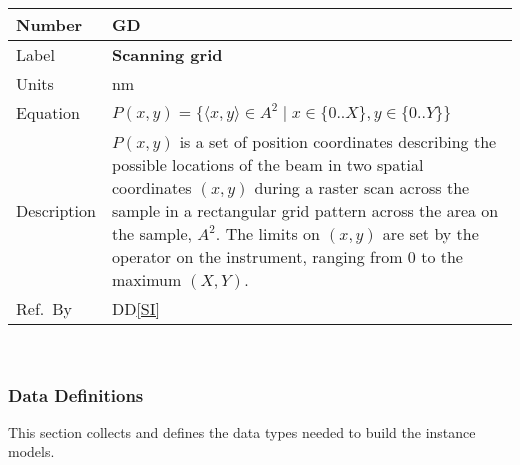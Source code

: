 \documentclass[12pt]{article}
\newcommand{\colAwidth}{0.13\textwidth}
\newcommand{\colBwidth}{0.82\textwidth}
\newcounter{defnum} %
\newcommand{\ddref}[1]{DD\ref{#1}}
\begin{document}
\noindent
\begin{minipage}{\textwidth}
	\renewcommand*{\arraystretch}{1.5}
	\begin{tabular}{| p{\colAwidth} | p{\colBwidth}|}
		\hline
		\rowcolor[gray]{0.9}
		Number& GD{defnum}\thedefnum \label{grid}\\
		\hline
		Label & \textbf{Scanning grid}  \\
		\hline
		Units& \si{\nano\metre}\\
		\hline
		Equation& $P(x,y) = \{\langle x, y \rangle \in A^2 \mid x \in \{0..X\}, y \in \{0..Y\} \}$\\
		\hline
		Description & $P(x,y)$ is a set of position coordinates describing the possible locations of the beam in two spatial coordinates $(x, y)$ during a raster scan across the sample in a rectangular grid pattern across the area on the sample, $A^2$. The limits on $(x,y)$ are set by the operator on the instrument, ranging from 0 to the maximum $(X,Y)$.
		\\
		  \hline
		  Ref.\ By & \ddref{SI}\\
		  \hline
	\end{tabular}
\end{minipage}\\

\subsubsection{Data Definitions}\label{sec_datadef}

This section collects and defines the data types needed to build the instance
models.

~\newline
\end{document}

